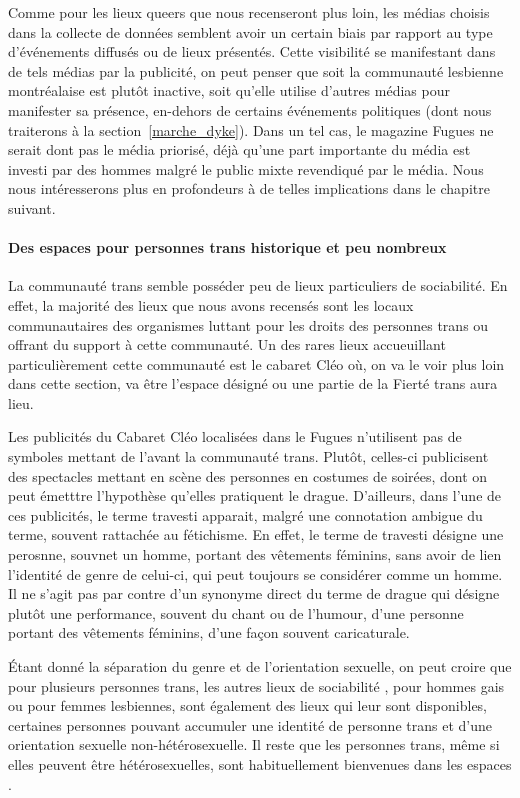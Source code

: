 Comme pour les lieux queers que nous recenseront plus loin, les médias choisis dans la collecte de données semblent avoir un certain biais par rapport au type d'événements diffusés ou de lieux présentés.
Cette visibilité se manifestant dans de tels médias par la publicité, on peut penser que soit la communauté lesbienne montréalaise est plutôt inactive, soit qu'elle utilise d'autres médias pour manifester sa présence, en-dehors de certains événements politiques (dont nous traiterons à la section~\ref{marche_dyke}).
Dans un tel cas, le magazine Fugues ne serait dont pas le média priorisé, déjà qu'une part importante du média est investi par des hommes malgré le public mixte revendiqué par le média.
Nous nous intéresserons plus en profondeurs à de telles implications dans le chapitre suivant.

\paragraph{Des espaces pour personnes trans historique et peu nombreux}
La communauté trans semble posséder peu de lieux particuliers de sociabilité.
En effet, la majorité des lieux que nous avons recensés sont les locaux communautaires des organismes luttant pour les droits des personnes trans ou offrant du support à cette communauté.
Un des rares lieux accueuillant particulièrement cette communauté est le cabaret Cléo où, on va le voir plus loin dans cette section, va être l'espace désigné ou une partie de la Fierté trans aura lieu.

Les publicités du Cabaret Cléo localisées dans le Fugues n'utilisent pas de symboles mettant de l'avant la communauté trans.
Plutôt, celles-ci publicisent des spectacles mettant en scène des personnes en costumes de soirées, dont on peut émetttre l'hypothèse qu'elles pratiquent le drague.
D'ailleurs, dans l'une de ces publicités, le terme travesti apparait, malgré une connotation ambigue du terme, souvent rattachée au fétichisme.
En effet, le terme de travesti désigne une perosnne, souvnet un homme, portant des vêtements féminins, sans avoir de lien l'identité de genre de celui-ci, qui peut toujours se considérer comme un homme.
Il ne s'agit pas par contre d'un synonyme direct du terme de drague qui désigne plutôt une performance, souvent du chant ou de l'humour, d'une personne portant des vêtements féminins, d'une façon souvent caricaturale.

Étant donné la séparation du genre et de l'orientation sexuelle, on peut croire que pour plusieurs personnes trans, les autres lieux de sociabilité \lgbt, pour hommes gais ou pour femmes lesbiennes, sont également des lieux qui leur sont disponibles, certaines personnes pouvant accumuler une identité de personne trans et d'une orientation sexuelle non-hétérosexuelle.
Il reste que les personnes trans, même si elles peuvent être hétérosexuelles, sont habituellement bienvenues dans les espaces \lgbt{}.

